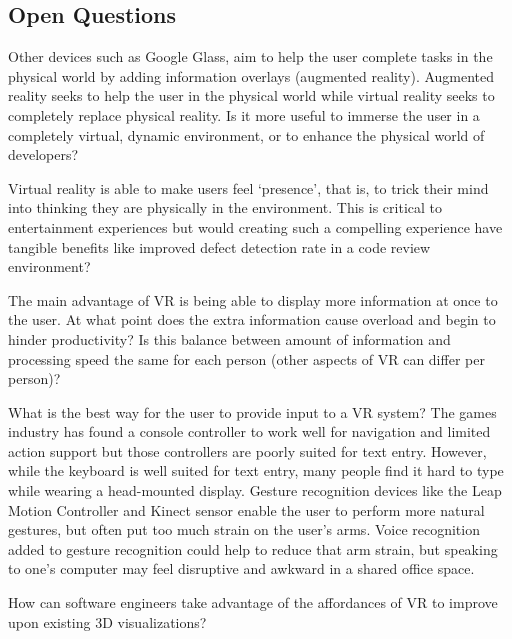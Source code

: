 \documentclass[conference]{IEEEtran}
\begin{document}
\subsection{Open Questions}

Other devices such as Google Glass, aim to help the user complete tasks in the physical world by adding information overlays (augmented reality). 
Augmented reality seeks to help the user in the physical world while virtual reality seeks to completely replace physical reality. 
Is it more useful to immerse the user in a completely virtual, dynamic environment, or to enhance the physical world of developers?
  
Virtual reality is able to make users feel `presence', that is, to trick their mind into thinking they are physically in the environment. 
This is critical to entertainment experiences but would creating such a compelling experience have tangible benefits like improved defect detection rate in a code review environment? 

The main advantage of VR is being able to display more information at once to the user.  
At what point does the extra information cause overload and begin to hinder productivity?  
Is this balance between amount of information and processing speed the same for each person (other aspects of VR can differ per person)?


What is the best way for the user to provide input to a VR system? 
The games industry has found a console controller to work well for navigation and limited action support but those controllers are poorly suited for text entry. 
However, while the keyboard is well suited for text entry, many people find it hard to type while wearing a head-mounted display. 
Gesture recognition devices like the Leap Motion Controller and Kinect sensor enable the user to perform more natural gestures, but often put too much strain on the user's arms. 
Voice recognition added to gesture recognition could help to reduce that arm strain, but speaking to one's computer may feel disruptive and awkward in a shared office space.

How can software engineers take advantage of the affordances of VR to improve upon existing 3D visualizations?
\end{document}
